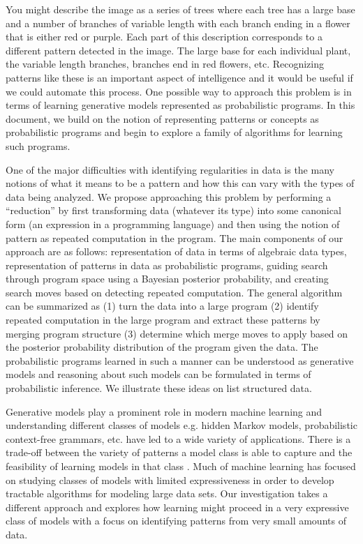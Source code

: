 \documentclass[a4paper,10pt]{article}
\begin{document}
You might describe the image as a series of trees where each tree has a large base and a number of branches of variable length with each branch ending in a flower that is either red or purple.  Each part of this description corresponds to a different pattern detected in the image.  The large base for each individual plant, the variable length branches, branches end in red flowers, etc.  Recognizing patterns like these is an important aspect of intelligence and it would be useful if we could automate this process.  One possible way to approach this problem is in terms of learning generative models represented as probabilistic programs.  In this document, we build on the notion of representing patterns or concepts as probabilistic programs \cite{A.Stuhlmueller:2010:6d11a} and begin to explore a family of algorithms for learning such programs.

One of the major difficulties with identifying regularities in data is the many notions of what it means to be a pattern and how this can vary with the types of data being analyzed.   We propose approaching this problem by performing a ``reduction'' by first transforming data (whatever its type) into some canonical form (an expression in a programming language) and then using the notion of pattern as repeated computation in the program.  The main components of our approach are as follows: representation of data in terms of algebraic data types, representation of patterns in data as probabilistic programs, guiding search through program space using a Bayesian posterior probability, and creating search moves based on detecting repeated computation.  The general algorithm can be summarized as (1) turn the data into a large program (2) identify repeated computation in the large program and extract these patterns by merging program structure (3) determine which merge moves to apply based on the posterior probability distribution of the program given the data.  The probabilistic programs learned in such a manner can be understood as generative models and reasoning about such models can be formulated in terms of probabilistic inference.  We illustrate these ideas on list structured data.  

Generative models play a prominent role in modern machine learning and understanding different classes of models e.g. hidden Markov models, probabilistic context-free grammars, etc. have led to a wide variety of applications.  There is a trade-off between the variety of patterns a model class is able to capture and the feasibility of learning models in that class \cite{Russell2003}.  Much of machine learning has focused on studying classes of models with limited expressiveness in order to develop tractable algorithms for modeling large data sets.  Our investigation takes a different approach and explores how learning might proceed in a very expressive class of models with a focus on identifying patterns from very small amounts of data.  
\end{document}
